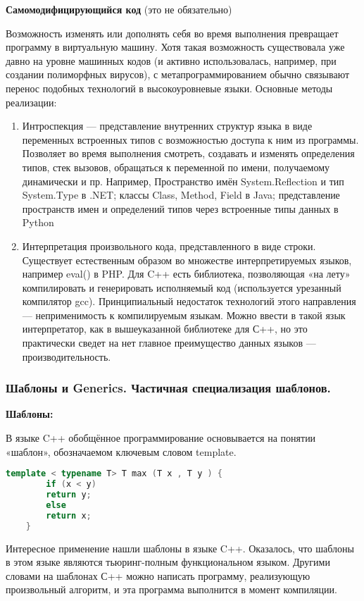 \textbf{Самомодифицирующийся код} (это не обязательно)

Возможность изменять или дополнять себя во время выполнения превращает программу в виртуальную машину. Хотя такая возможность существовала уже давно на уровне машинных кодов (и активно использовалась, например, при создании полиморфных вирусов), с метапрограммированием обычно связывают перенос подобных технологий в высокоуровневые языки. Основные методы реализации:
\begin{enumerate}
	\item Интроспекция — представление внутренних структур языка в виде переменных встроенных типов с возможностью доступа к ним из программы. Позволяет во время выполнения смотреть, создавать и изменять определения типов, стек вызовов, обращаться к переменной по имени, получаемому динамически и пр.
	Например, Пространство имён System.Reflection и тип System.Type в .NET; классы Class, Method, Field в Java; представление пространств имен и определений типов через встроенные типы данных в Python
	\item  Интерпретация произвольного кода, представленного в виде строки.
	Существует естественным образом во множестве интерпретируемых языков, например eval() в PHP.
	Для C++ есть библиотека, позволяющая «на лету» компилировать и генерировать исполняемый код (используется урезанный компилятор gcc).
	Принципиальный недостаток технологий этого направления — неприменимость к компилируемым языкам. Можно ввести в такой язык интерпретатор, как в вышеуказанной библиотеке для С++, но это
	практически сведет на нет главное преимущество данных языков — производительность.
\end{enumerate}

\subsubsection{Шаблоны и Generics. Частичная специализация шаблонов.}

\textbf{Шаблоны:}

В языке C++ обобщённое программирование основывается на понятии «шаблон», обозначаемом ключевым словом template.

\begin{lstlisting}[language=C++]
	template < typename T> T max (T x , T y ) {
		if (x < y)
		return y;
		else
		return x;
	}
\end{lstlisting}

Интересное применение нашли шаблоны в языке C++. Оказалось, что шаблоны в этом языке являются тьюринг-полным функциональном языком. Другими словами на шаблонах С++ можно написать программу, реализующую произвольный алгоритм, и эта программа выполнится в момент компиляции.

